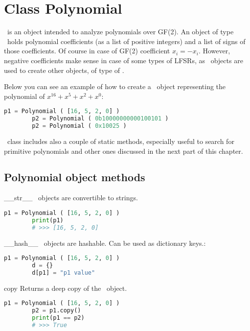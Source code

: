 \chapter{Class Polynomial}

\Polynomial\ is an object intended to analyze polynomials over GF(2). An object of type \Polynomial\ holds polynomial coefficients (as a list of positive integers) and a list of signs of those coefficients. Of course in case of GF(2) coefficient $x_i = -x_i$. However, negative coefficients make sense in case of some types of LFSRs, as \Polynomial\ objects are used to create other objects, of type of \Lfsr.

Below you can see an example of how to create a \Polynomial\ object representing the polynomial of $x^{16} + x^5 + x^2 + x^0$:
\begin{lstlisting}[language=Python]
		p1 = Polynomial ( [16, 5, 2, 0] )
		p2 = Polynomial ( 0b10000000000100101 )
		p2 = Polynomial ( 0x10025 )
\end{lstlisting}

\Polynomial\ class includes also a couple of static methods, especially useful to search for primitive polynomials and other ones discussed in the next part of this chapter.

\section{Polynomial object methods}

 {\_\_str\_\_} {} {
	\Polynomial\ objects are convertible to strings.
}
\begin{lstlisting}[language=Python]
		p1 = Polynomial ( [16, 5, 2, 0] )
		print(p1)
		# >>> [16, 5, 2, 0]
\end{lstlisting}

 {\_\_hash\_\_} {} {
	\Polynomial\ objects are hashable. Can be used as dictionary keys.:
}
\begin{lstlisting}[language=Python]
		p1 = Polynomial ( [16, 5, 2, 0] )
		d = {}
		d[p1] = "p1 value"
\end{lstlisting}

 {copy} {} {
	Returns a deep copy of the \Polynomial\ object.
}
\begin{lstlisting}[language=Python]
		p1 = Polynomial ( [16, 5, 2, 0] )
		p2 = p1.copy()
		print(p1 == p2)
		# >>> True
\end{lstlisting}

